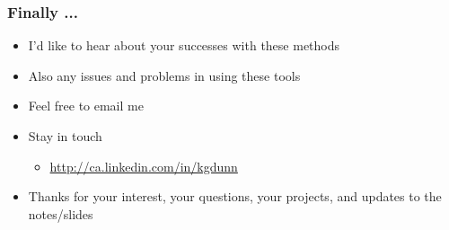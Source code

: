 \begin{frame}\frametitle{Finally ...}
	\begin{itemize}
		\item	I'd like to hear about your successes with these methods 
		\item	Also any issues and problems in using these tools 
		\item	Feel free to email me
		\item	Stay in touch
		\begin{itemize}
			\item	\href{http://ca.linkedin.com/in/kgdunn}{http://ca.linkedin.com/in/kgdunn}
		\end{itemize}
		\item	Thanks for your interest, your questions, your projects, and updates to the notes/slides
	\end{itemize}
\end{frame}
